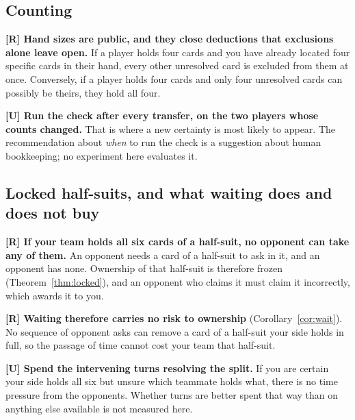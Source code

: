 \documentclass[11pt]{article}
\theoremstyle{definition}
\begin{document}
\subsection{Counting}
\label{app:human-count}

\textbf{[R] Hand sizes are public, and they close deductions that exclusions
alone leave open.} If a player holds four cards and you have already located four
specific cards in their hand, every other unresolved card is excluded from them
at once. Conversely, if a player holds four cards and only four unresolved cards
can possibly be theirs, they hold all four.

\textbf{[U] Run the check after every transfer, on the two players whose
counts changed.} That is where a new certainty is most likely to appear. The
recommendation about \emph{when} to run the check is a suggestion about human
bookkeeping; no experiment here evaluates it.

\subsection{Locked half-suits, and what waiting does and does not buy}
\label{app:human-locked}

\textbf{[R] If your team holds all six cards of a half-suit, no opponent can
take any of them.} An opponent needs a card of a half-suit to ask in it, and an
opponent has none. Ownership of that half-suit is therefore frozen
(Theorem~\ref{thm:locked}), and an opponent who claims it must claim it
incorrectly, which awards it to you.

\textbf{[R] Waiting therefore carries no risk to ownership}
(Corollary~\ref{cor:wait}). No sequence of opponent asks can remove a card of a
half-suit your side holds in full, so the passage of time cannot cost your team
that half-suit.

\textbf{[U] Spend the intervening turns resolving the split.} If you are
certain your side holds all six but unsure which teammate holds what, there is
no time pressure from the opponents. Whether turns are better spent that way
than on anything else available is not measured here.
\end{document}
